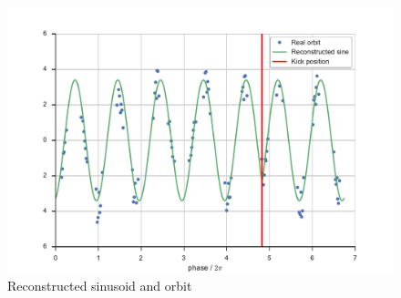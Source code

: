 \begin{figure}
    \centering
    \includegraphics[width=\linewidth]{img/loc_reconstructed_sine}
    \caption{\label{fig:loc_reconstructed_sine} Reconstructed sinusoid and orbit}
\end{figure}

